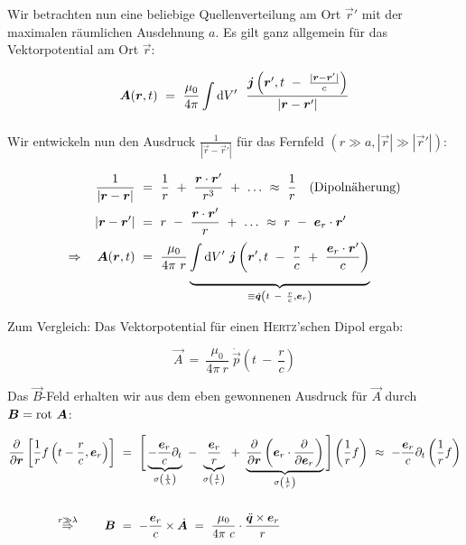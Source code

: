 Wir betrachten nun eine beliebige Quellenverteilung am Ort $\vec{r}'$ mit der maximalen räumlichen Ausdehnung $a$. Es gilt ganz allgemein für das Vektorpotential am Ort $\vec{r}$:

\begin{equation*}
\vec{A}(\vec{r},t) \ = \ \frac{\mu_0}{4\pi}\Int{}{}{V'} \ \frac{\vec{j}\left(\vec{r}',t\ - \ \frac{|\vec{r}-\vec{r}'|}{c}\right)}{|\vec{r}-\vec{r}'|}
\end{equation*}

Wir entwickeln nun den Ausdruck $\frac{1}{|\vec{r}-\vec{r}'|}$ für das Fernfeld $(r\gg a, |\vec{r}| \gg |\vec{r}'|)$:

\begin{align*}
\frac{1}{|\vec{r}-\vec{r}|}  \ &= \ \frac{1}{r} \ + \ \frac{\vec{r}\cdot\vec{r}'}{r^3} \ + \ \ldots \ \approx \ \frac{1}{r} \quad \text{(Dipolnäherung)}\\
|\vec{r}-\vec{r}'|  \ &= \ r \ - \ \frac{\vec{r}\cdot\vec{r}'}{r} \ + \ \ldots \ \approx \ r \ - \ \vec{e}_r \cdot \vec{r}'\\
\Rightarrow \quad \vec{A}(\vec{r},t)  \ &= \ \frac{\mu_0}{4\pi \ r} \underbrace{\Int{}{}{V'} \vec{j} \left(\vec{r}',t \ - \ \frac{r}{c} \ + \ \frac{\vec{e}_r\cdot\vec{r}'}{c}\right)}_{\equiv \dot{\vec{q}}\left(t \ - \ \frac{r}{c},\vec{e}_r\right)}
\end{align*}

Zum Vergleich: Das Vektorpotential für einen \textsc{Hertz}'schen Dipol ergab:

\begin{equation*}
\vec{A}  \ = \ \frac{\mu_0}{4\pi \ r} \ \dot{\vec{p}}\left(t \ - \ \frac{r}{c}\right)
\end{equation*}

Das $\vec{B}$-Feld erhalten wir aus dem eben gewonnenen Ausdruck für $\vec{A}$ durch $\bm{B}=\text{rot }\bm{A}$:

\begin{align*}
\pdiff{}{\vec{r}}\left[\frac{1}{r} f \left(t-\frac{r}{c},\vec{e}_r\right)\right] \ &= \ \Bigg[\underbrace{-\frac{\vec{e}_r}{c}\partial_t}_{\sigma\left(\frac{1}{\lambda}\right)} \ - \ \underbrace{\frac{\vec{e}_r}{r}}_{\sigma\left(\frac{1}{r}\right)} \ + \ \underbrace{\pdiff{}{\vec{r}}\left(\vec{e}_r\cdot\pdiff{}{\vec{e}_r}\right)}_{\sigma\left(\frac{1}{r}\right)}\Bigg ] \left(\frac{1}{r}f\right) \ \approx \ - \frac{\vec{e}_r}{c} \partial_t \left(\frac{1}{r}f\right)\\
\ \\
\overset{r\gg\lambda}{\Rightarrow} \qquad \vec{B}  \ &= \ -\frac{\vec{e}_r}{c}\times\dot{\vec{A}}  \ = \  \frac{\mu_0}{4\pi \ c} \cdot \frac{\ddot{\vec{q}}\times\vec{e}_r}{r}
\end{align*}

